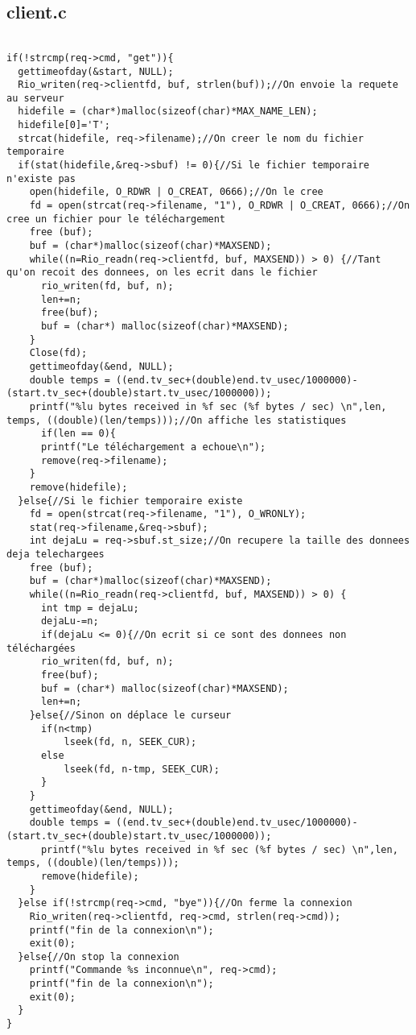 \documentclass{report}
\begin{document}
            \subsection{client.c}
            \begin{lstlisting}

if(!strcmp(req->cmd, "get")){
  gettimeofday(&start, NULL);
  Rio_writen(req->clientfd, buf, strlen(buf));//On envoie la requete au serveur
  hidefile = (char*)malloc(sizeof(char)*MAX_NAME_LEN);
  hidefile[0]='T';
  strcat(hidefile, req->filename);//On creer le nom du fichier temporaire
  if(stat(hidefile,&req->sbuf) != 0){//Si le fichier temporaire n'existe pas
    open(hidefile, O_RDWR | O_CREAT, 0666);//On le cree
    fd = open(strcat(req->filename, "1"), O_RDWR | O_CREAT, 0666);//On cree un fichier pour le téléchargement
    free (buf);
    buf = (char*)malloc(sizeof(char)*MAXSEND);
    while((n=Rio_readn(req->clientfd, buf, MAXSEND)) > 0) {//Tant qu'on recoit des donnees, on les ecrit dans le fichier
      rio_writen(fd, buf, n);
      len+=n;
      free(buf);
      buf = (char*) malloc(sizeof(char)*MAXSEND);
    }
    Close(fd);
    gettimeofday(&end, NULL);
    double temps = ((end.tv_sec+(double)end.tv_usec/1000000)-(start.tv_sec+(double)start.tv_usec/1000000));
    printf("%lu bytes received in %f sec (%f bytes / sec) \n",len, temps, ((double)(len/temps)));//On affiche les statistiques
      if(len == 0){
      printf("Le téléchargement a echoue\n");
      remove(req->filename);
    }
    remove(hidefile);
  }else{//Si le fichier temporaire existe
    fd = open(strcat(req->filename, "1"), O_WRONLY);
    stat(req->filename,&req->sbuf);
    int dejaLu = req->sbuf.st_size;//On recupere la taille des donnees deja telechargees
    free (buf);
    buf = (char*)malloc(sizeof(char)*MAXSEND);
    while((n=Rio_readn(req->clientfd, buf, MAXSEND)) > 0) {
      int tmp = dejaLu;
      dejaLu-=n;
      if(dejaLu <= 0){//On ecrit si ce sont des donnees non téléchargées
      rio_writen(fd, buf, n);
      free(buf);
      buf = (char*) malloc(sizeof(char)*MAXSEND);
      len+=n;
    }else{//Sinon on déplace le curseur
      if(n<tmp)
          lseek(fd, n, SEEK_CUR);
      else
          lseek(fd, n-tmp, SEEK_CUR);
      }
    }
    gettimeofday(&end, NULL);
    double temps = ((end.tv_sec+(double)end.tv_usec/1000000)-(start.tv_sec+(double)start.tv_usec/1000000));
      printf("%lu bytes received in %f sec (%f bytes / sec) \n",len, temps, ((double)(len/temps)));
      remove(hidefile);
    }
  }else if(!strcmp(req->cmd, "bye")){//On ferme la connexion
    Rio_writen(req->clientfd, req->cmd, strlen(req->cmd));
    printf("fin de la connexion\n");
    exit(0);
  }else{//On stop la connexion
    printf("Commande %s inconnue\n", req->cmd);
    printf("fin de la connexion\n");
    exit(0);
  }
}
            \end{lstlisting}
\end{document}

